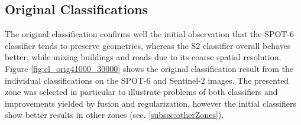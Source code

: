 \documentclass[10pt]{article}
\newcommand{\tile}{41000_30000}
\begin{document}
\subsection{Original Classifications}
The original classification confirms well the initial observation that the SPOT-6 classifier tends to preserve geometries, whereas the S2 classifier overall behaves better, while mixing buildings and roads due to its coarse spatial resolution. Figure \ref{fig:cl_orig\tile} shows the original classification result from the individual classifications on the SPOT-6 and Sentinel-2 images. The presented zone was selected in particular to illustrate problems of both classifiers and improvements yielded by fusion and regularization, however the initial classifiers show better results in other zones (sec. \ref{subsec:otherZones}).
\end{document}
